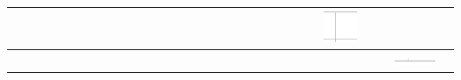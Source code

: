 \documentclass[10pt]{article}
\begin{document}
\begin{center}
\begin{tabular}{|c|c|c|c|c|c|c|c|c|c|c|c|c|c|c|c|c|c|c|c|c|c|c|c|c|c|c|c|c|c|}
 &  &  &  &  &  &  &  &  &  &  &  &  &  &  &  &  &  &  &  &  &  &  &  &  & \includegraphics[max width=\textwidth]{2024_11_21_94f02db55673a8a7b820g-12(7)}
 &  &  &  &  \\
\hline
 &  &  &  &  &  &  &  &  &  &  &  &  &  &  &  &  &  &  &  &  &  &  &  &  &  &  &  & \includegraphics[max width=\textwidth]{2024_11_21_94f02db55673a8a7b820g-12(6)}
 &  \\
\hline
\end{tabular}
\end{center}
\end{document}
